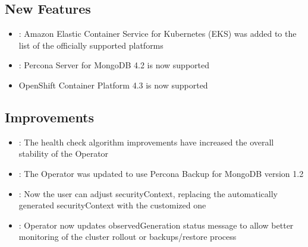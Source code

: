 \documentclass[letterpaper,10pt,english]{sphinxmanual}
\begin{document}
\subsection{New Features}
\label{\detokenize{RN/Kubernetes-Operator-for-PSMONGODB-RN1.4.0:new-features}}\begin{itemize}
\item {} 
: Amazon Elastic Container Service for Kubernetes (EKS)
was added to the list of the officially supported platforms

\item {} 
: Percona Server for MongoDB 4.2 is now supported

\item {} 
OpenShift Container Platform 4.3 is now supported

\end{itemize}


\subsection{Improvements}
\label{\detokenize{RN/Kubernetes-Operator-for-PSMONGODB-RN1.4.0:improvements}}\begin{itemize}
\item {} 
: The health check algorithm improvements have increased the overall stability of the Operator

\item {} 
: The Operator was updated to use Percona Backup for MongoDB version 1.2

\item {} 
: Now the user can adjust securityContext, replacing the automatically generated securityContext with the customized one

\item {} 
: Operator now updates observedGeneration status message to allow better monitoring of the cluster rollout or backups/restore process

\end{itemize}
\end{document}
